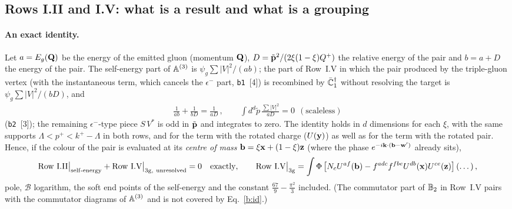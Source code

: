 \subsection{Rows I.II and I.V: what is a result and what is a grouping}\label{sec:b-group}
\paragraph{An exact identity.} Let $a=E_g(\mathbf{Q})$ be the energy of the emitted gluon (momentum $\mathbf{Q}$), $D=\tilde{\mathbf{p}}^2/(2\xi(1-\xi)Q^+)$ the relative energy of the pair and $b=a+D$ the energy of the pair. The self-energy part of $\mathbb{A}^{(3)}$ is $\psi_g\sum|V|^2/(ab)$; the part of Row~I.V in which the pair produced by the triple-gluon vertex (with the instantaneous term, which cancels the $\epsilon^-$ part, \texttt{b1}~[4]) is recombined by $\bar{\mathbb{C}}_1^\dagger$ without resolving the target is $\psi_g\sum|V|^2/(bD)$, and
\begin{align}\label{b:id}
\frac{1}{ab}+\frac{1}{bD}=\frac{1}{aD}\,,\qquad\int d^d\tilde p\,\frac{\sum|V|^2}{aD}=0\ \ (\text{scaleless})
\end{align}
(\texttt{b2}~[3]); the remaining $\epsilon^-$-type piece $S\,V^*$ is odd in $\tilde{\mathbf{p}}$ and integrates to zero. The identity holds in $d$ dimensions for each $\xi$, with the same supports $\Lambda<p^+<k^+-\Lambda$ in both rows, and for the term with the rotated charge ($U(\mathbf{y})$) as well as for the term with the rotated pair. Hence, if the colour of the pair is evaluated at its \emph{centre of mass} $\mathbf{b}=\xi\mathbf{x}+(1-\xi)\mathbf{z}$ (where the phase $e^{-i\mathbf{k}\cdot(\mathbf{b}-\mathbf{w}')}$ already sits),
\begin{align}\label{b:split}
\text{Row I.II}\big|_{\rm self\text{-}energy}+\text{Row I.V}\big|_{\rm 3g,\ unresolved}=0\quad\text{exactly},\qquad
\text{Row I.V}\big|_{\rm 3g}=\int\Phi\,\big[N_cU^{af}(\mathbf{b})-f^{adc}f^{fbe}U^{db}(\mathbf{x})U^{ce}(\mathbf{z})\big]\,(\dots)\,,
\end{align}
pole, $\mathcal B$ logarithm, the soft end points of the self-energy and the constant $\frac{67}{9}-\frac{\pi^2}{3}$ included. (The commutator part of $\mathbb{B}_2$ in Row~I.V pairs with the commutator diagrams of $\mathbb{A}^{(3)}$ and is not covered by Eq.~\eqref{b:id}.)

